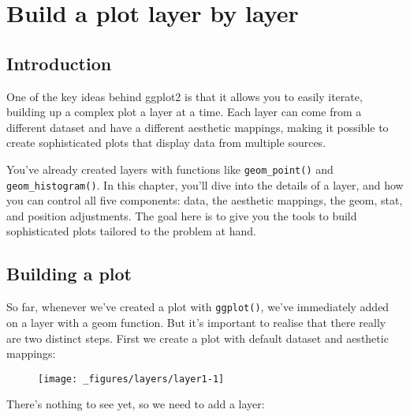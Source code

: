 \chapter{Build a plot layer by layer}\label{cha:layers}

\section{Introduction}

One of the key ideas behind ggplot2 is that it allows you to easily
iterate, building up a complex plot a layer at a time. Each layer can
come from a different dataset and have a different aesthetic mappings,
making it possible to create sophisticated plots that display data from
multiple sources.

You've already created layers with functions like \texttt{geom\_point()}
and \texttt{geom\_histogram()}. In this chapter, you'll dive into the
details of a layer, and how you can control all five components: data,
the aesthetic mappings, the geom, stat, and position adjustments. The
goal here is to give you the tools to build sophisticated plots tailored
to the problem at hand.

\section{Building a plot}

So far, whenever we've created a plot with \texttt{ggplot()}, we've
immediately added on a layer with a geom function. But it's important to
realise that there really are two distinct steps. First we create a plot
with default dataset and aesthetic mappings:

\begin{Shaded}
\begin{Highlighting}[]
\StringTok{ }
\end{Highlighting}
\end{Shaded}

\begin{figure}[H]
  \centering
  \texttt{[image: \_figures/layers/layer1-1]}
\end{figure}

There's nothing to see yet, so we need to add a layer:

\begin{Shaded}
\begin{Highlighting}[]
\StringTok{ }\NormalTok{()}
\end{Highlighting}
\end{Shaded}

